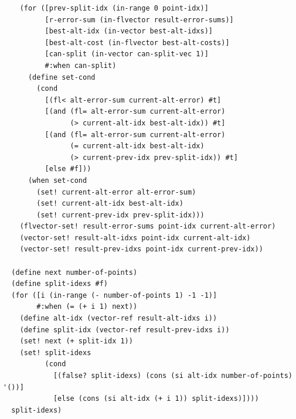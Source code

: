 \documentclass{article}
\begin{document}
\begin{lstlisting}
    (for ([prev-split-idx (in-range 0 point-idx)]
          [r-error-sum (in-flvector result-error-sums)]
          [best-alt-idx (in-vector best-alt-idxs)]
          [best-alt-cost (in-flvector best-alt-costs)]
          [can-split (in-vector can-split-vec 1)]
          #:when can-split)
      (define set-cond
        (cond
          [(fl< alt-error-sum current-alt-error) #t]
          [(and (fl= alt-error-sum current-alt-error) 
                (> current-alt-idx best-alt-idx)) #t]
          [(and (fl= alt-error-sum current-alt-error)
                (= current-alt-idx best-alt-idx)
                (> current-prev-idx prev-split-idx)) #t]
          [else #f]))
      (when set-cond
        (set! current-alt-error alt-error-sum)
        (set! current-alt-idx best-alt-idx)
        (set! current-prev-idx prev-split-idx)))
    (flvector-set! result-error-sums point-idx current-alt-error)
    (vector-set! result-alt-idxs point-idx current-alt-idx)
    (vector-set! result-prev-idxs point-idx current-prev-idx))

  (define next number-of-points)
  (define split-idexs #f)
  (for ([i (in-range (- number-of-points 1) -1 -1)]
        #:when (= (+ i 1) next))
    (define alt-idx (vector-ref result-alt-idxs i))
    (define split-idx (vector-ref result-prev-idxs i))
    (set! next (+ split-idx 1))
    (set! split-idexs
          (cond
            [(false? split-idexs) (cons (si alt-idx number-of-points) '())]
            [else (cons (si alt-idx (+ i 1)) split-idexs)])))
  split-idexs)
\end{lstlisting}
\end{document}
